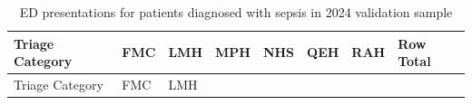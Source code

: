 \documentclass[
  a4paper,
  ,captions=tableheading
]{scrartcl}
\begin{document}
\begin{longtable}[]{@{}
  >{\raggedright\arraybackslash}p{}
  >{\raggedleft\arraybackslash}p{}
  >{\raggedleft\arraybackslash}p{}
  >{\raggedleft\arraybackslash}p{}
  >{\raggedleft\arraybackslash}p{}
  >{\raggedleft\arraybackslash}p{}
  >{\raggedleft\arraybackslash}p{}
  >{\raggedleft\arraybackslash}p{}@{}}
\caption{\label{tbl:hospitals_2024}ED presentations for patients
diagnosed with sepsis in 2024 validation sample}\tabularnewline
\toprule\noalign{}
\begin{minipage}[b]{\linewidth}\raggedright
Triage Category
\end{minipage} & \begin{minipage}[b]{\linewidth}\raggedleft
FMC
\end{minipage} & \begin{minipage}[b]{\linewidth}\raggedleft
LMH
\end{minipage} & \begin{minipage}[b]{\linewidth}\raggedleft
MPH
\end{minipage} & \begin{minipage}[b]{\linewidth}\raggedleft
NHS
\end{minipage} & \begin{minipage}[b]{\linewidth}\raggedleft
QEH
\end{minipage} & \begin{minipage}[b]{\linewidth}\raggedleft
RAH
\end{minipage} & \begin{minipage}[b]{\linewidth}\raggedleft
Row Total
\end{minipage} \\
\midrule\noalign{}
\endfirsthead
\toprule\noalign{}
\begin{minipage}[b]{\linewidth}\raggedright
Triage Category
\end{minipage} & \begin{minipage}[b]{\linewidth}\raggedleft
FMC
\end{minipage} & \begin{minipage}[b]{\linewidth}\raggedleft
LMH
\end{minipage} & \begin{minipage}[b]{\linewidth}\raggedleft

\end{minipage}
\end{longtable}
\end{document}
